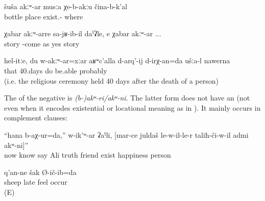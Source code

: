 \begin{exe}
	\ex	\label{ex:There is no place without bottles}
	\gll	šuša	akːʷ-ar	musːa	χe-b-akːu	čina-b-k'al\\
		bottle		place	exist.-	where\\
	\glt	{}

	\ex	\label{ex:as if his arrival was unexpected (lit. without news), yes unexpected}
	\gll	χabar	akːʷ-arre	sa-jʁ-ib-il	daˁʡle,		e	χabar	akːʷ-ar ...\\
		story		-come	as	yes	story	\\
	\glt	{}

	\ex	\label{ex:Well, you like this, even me not being there, should be able to do the 40 days, probably}
	\gll	hel-itːe,	du	w-akːʷ-ar=xːar	aʁʷc'alla	d-arq'-ij	d-irχ-an=da	ušːa-l		nawerna\\
		that			40.days	do	be.able			probably\\
	\glt	{} (i.e. the religious ceremony held 40 days after the death of a person)
\end{exe}

The  of the negative  is \textit{{(b-)akʷ-ri\slash akʷ-ni}}. The latter form does not have an  (not even when it encodes existential or locational meaning as in ). It mainly occurs in complement clauses:

\begin{exe}
	\ex	\label{ex:Now I know, says Ali, that there is no happy man than the one who has a true friend}
	\gll	``hana	b-aχ-ur=da,''	w-ik'ʷ-ar	ʡaˁli,	[mar-ce	juldaš	le-w-il-le-r	taliħ-či-w-il	admi	akʷ-ni]''\\
		now	know	say	Ali	truth	friend	exist	happiness	person	\\
	\glt	{}

	\ex	\label{ex:I guessed late that my sheep were not there}
		q'an-ne	šak	Ø-ič-ib=da\\
			sheep		late	feel	occur\\
	\glt	{} (E)
\end{exe}


